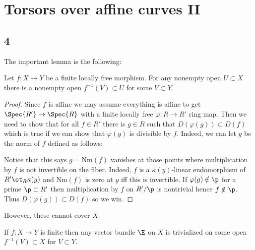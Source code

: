 \documentclass{article}
\begin{document}
\section{Torsors over affine curves II}

\subsection{4}

The important lemma is the following:

\begin{lemma}
Let $f : X \to Y$ be a finite locally free morphism. For any nonempty open $U \subset X$ there is a nonempty open $f^{-1}(V) \subset U$ for some $V \subset Y$.
\end{lemma}

\begin{proof}
Since $f$ is affine we may assume everything is affine to get $\Spec{R'} \to \Spec{R}$ with a finite locally free $\varphi : R \to R'$ ring map. Then we need to show that for all $f \in R'$ there is $g \in R$ such that $D(\varphi(g)) \subset D(f)$ which is true if we can show that $\varphi(g)$ is divisible by $f$. Indeed, we can let $g$ be the norm of $f$ defined as follows:
\begin{center}
\end{center} 
Notice that this says $g = \mathrm{Nm}(f)$ vanishes at those points where multiplication by $f$ is not invertible on the fiber. Indeed, $f$ is a $\kappa(y)$-linear endomorphism of $R' \ot_R \kappa(y)$ and $\mathrm{Nm}(f)$ is zero at $y$ iff this is invertible.
If $\varphi(g) \notin \p$ for a prime $\p \subset R'$ then multiplication by $f$ on $R' / \p$ is nontrivial hence $f \notin \p$. Thus $D(\varphi(g)) \subset D(f)$ so we win. 
\end{proof}


\begin{rmk}
However, these cannot cover $X$.
\end{rmk}


\begin{prop}
If $f : X \to Y$ is finite then any vector bundle $\E$ on $X$ is trivialized on some open $f^{-1}(V) \subset X$ for $V \subset Y$.
\end{prop}
\end{document}
